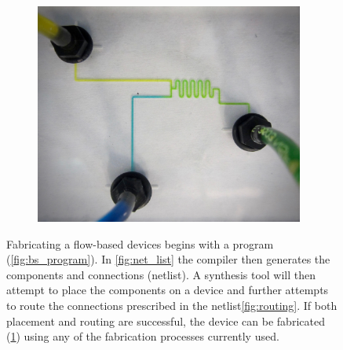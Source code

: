 \begin{figure}[tb]
\begin{subfigure}{0.33\textwidth}
        \includegraphics[width=0.97\textwidth]{figures/synthesized_mixer.jpg}
        \caption[short]{}
        \label{fig:fabricated_chip}
    \end{subfigure}
    \caption{Fabricating a flow-based devices begins with a \bs{} program (\cref{fig:bs_program}).  In \cref{fig:net_list} the \bs{} compiler then generates the components and connections (netlist).  A synthesis tool will then attempt to place the components on a device and further attempts to route the connections prescribed in the netlist\cref{fig:routing}.  If both placement and routing are successful, the device can be fabricated (\cref{fig:fabricated_chip}) using any of the fabrication processes currently used.}
    \label{fig:synthesis_process}
\end{figure}